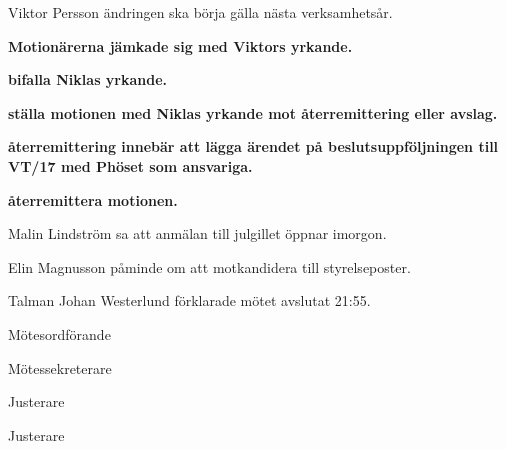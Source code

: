 \documentclass[10pt]{article}
\def\mo{Johan Westerlund}
\def\ms{Erik Månsson}
\def\ji{Elin Magnusson}
\def\jii{Pontus Landgren}
\begin{document}
\begin{paragrafer}
Viktor Persson \ypa ändringen ska börja gälla nästa verksamhetsår.

\textbf{Motionärerna jämkade sig med Viktors yrkande.}

\textbf{\Mba bifalla Niklas yrkande.}

\textbf{\Mba ställa motionen med Niklas yrkande mot återremittering eller avslag.}

\textbf{\Mba återremittering innebär att lägga ärendet på beslutsuppföljningen till VT/17 med Phöset som ansvariga.} %

\textbf{\Mba återremittera motionen.}

Malin Lindström sa att anmälan till julgillet öppnar imorgon.

Elin Magnusson påminde om att motkandidera till styrelseposter.

Talman {\mo} förklarade mötet avslutat 21:55.

\end{paragrafer}

\hidesignfoot
\begin{signatures}{4}
\signature{\mo}{Mötesordförande}
\signature{\ms}{Mötessekreterare}
\signature{\ji}{Justerare}
\signature{\jii}{Justerare}
\end{signatures}
\end{document}
